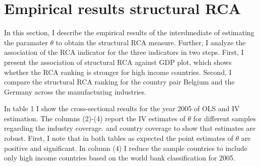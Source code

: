 \section{Empirical results structural RCA}
\label{sec:cross-section}
In this section, I describe the empirical results of the interdmediate of estimating the paramater $\theta$ to obtain the structural RCA measure.
Further, I analyze the association of the RCA indicator for the three indicators in two steps.
  First, I present the association of structural RCA against GDP plot, which shows whether the RCA ranking is stronger for high income countries.
Second, I compare the structural RCA ranking for the country pair Belgium and the Germany across the manufacturing industries.
\par
In table 1 I show the cross-sectional results for the year 2005 of OLS and IV estimation.
The columns (2)-(4) report the IV estimates of $\theta$  for different samples regarding the industry coverage. and country coverage to show that estimates are robust.
 First, I note that in both tables as expected the point estimates of $\theta$ are positive and significant.
In column (4) I reduce the sample countries to include only high income countries based on the world bank classification for 2005.
